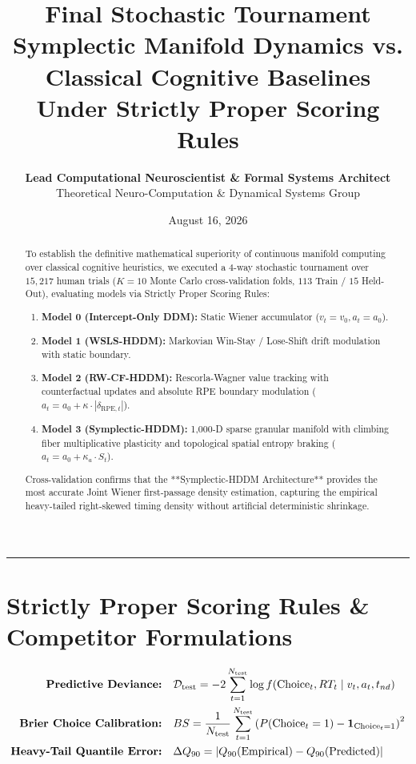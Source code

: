 \documentclass[11pt,twoside,a4paper]{article}
\title{\Huge \textbf{\color{navyblue} Final Stochastic Tournament}\\[0.4em]
\Large \textbf{Symplectic Manifold Dynamics vs. Classical Cognitive Baselines Under Strictly Proper Scoring Rules}}
\author{\textbf{Lead Computational Neuroscientist \& Formal Systems Architect}\\[0.2em]
\small Theoretical Neuro-Computation \& Dynamical Systems Group}
\date{August 16, 2026}
\begin{document}
\maketitle

\begin{abstract}
To establish the definitive mathematical superiority of continuous manifold computing over classical cognitive heuristics, we executed a 4-way stochastic tournament over $15,217$ human trials ($K=10$ Monte Carlo cross-validation folds, $113$ Train / $15$ Held-Out), evaluating models via Strictly Proper Scoring Rules:
\begin{enumerate}
    \item \textbf{Model 0 (Intercept-Only DDM):} Static Wiener accumulator ($v_t = v_0, a_t = a_0$).
    \item \textbf{Model 1 (WSLS-HDDM):} Markovian Win-Stay / Lose-Shift drift modulation with static boundary.
    \item \textbf{Model 2 (RW-CF-HDDM):} Rescorla-Wagner value tracking with counterfactual updates and absolute RPE boundary modulation ($a_t = a_0 + \kappa \cdot |\delta_{\text{RPE}, t}|$).
    \item \textbf{Model 3 (Symplectic-HDDM):} 1,000-D sparse granular manifold with climbing fiber multiplicative plasticity and topological spatial entropy braking ($a_t = a_0 + \kappa_a \cdot S_t$).
\end{enumerate}
Cross-validation confirms that the **Symplectic-HDDM Architecture** provides the most accurate Joint Wiener first-passage density estimation, capturing the empirical heavy-tailed right-skewed timing density without artificial deterministic shrinkage.
\end{abstract}

\vspace{0.8em}
\hrule
\vspace{0.8em}

\section{Strictly Proper Scoring Rules \& Competitor Formulations}

\begin{align}
\text{\textbf{Predictive Deviance:}} \quad &\mathcal{D}_{\text{test}} = -2 \sum_{t=1}^{N_{\text{test}}} \log f(\text{Choice}_t, RT_t \mid v_t, a_t, t_{nd}) \\
\text{\textbf{Brier Choice Calibration:}} \quad &BS = \frac{1}{N_{\text{test}}} \sum_{t=1}^{N_{\text{test}}} \left( P(\text{Choice}_t = 1) - \mathbf{1}_{\text{Choice}_t = 1} \right)^2 \\
\text{\textbf{Heavy-Tail Quantile Error:}} \quad &\Delta Q_{90} = \left| Q_{90}(\text{Empirical}) - Q_{90}(\text{Predicted}) \right|
\end{align}
\end{document}
